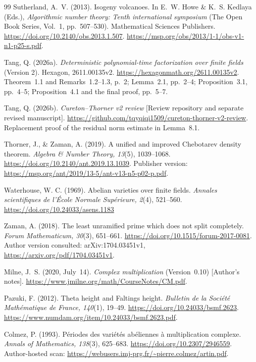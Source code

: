 \documentclass[11pt]{article}
\theoremstyle{definition}
\theoremstyle{remark}
\begin{document}
\begin{thebibliography}{99}
Sutherland, A.~V. (2013). Isogeny volcanoes.
In E.~W. Howe \& K.~S. Kedlaya (Eds.),
\emph{Algorithmic number theory: Tenth international symposium}
(The Open Book Series, Vol.~1, pp.~507--530). Mathematical Sciences Publishers.
\url{https://doi.org/10.2140/obs.2013.1.507}.
\url{https://msp.org/obs/2013/1-1/obs-v1-n1-p25-s.pdf}.

Tang, Q. (2026a).
\emph{Deterministic polynomial-time factorization over finite fields}
(Version 2). Hexagon, 2611.00135v2.
\url{https://hexagonmath.org/2611.00135v2}.
Theorem~1.1 and Remarks~1.2--1.3, p.~2; Lemma~2.1, pp.~2--4;
Proposition~3.1, pp.~4--5; Proposition~4.1 and the final proof,
pp.~5--7.

Tang, Q. (2026b).
\emph{Cureton--Thorner v2 review}
[Review repository and separate revised manuscript].
\url{https://github.com/tqyqiqi1509/cureton-thorner-v2-review}.
Replacement proof of the residual norm estimate in Lemma~8.1.

Thorner, J., \& Zaman, A. (2019).
A unified and improved Chebotarev density theorem.
\emph{Algebra \& Number Theory, 13}(5), 1039--1068.
\url{https://doi.org/10.2140/ant.2019.13.1039}.
Publisher version:
\url{https://msp.org/ant/2019/13-5/ant-v13-n5-p02-p.pdf}.

Waterhouse, W. C. (1969). Abelian varieties over finite fields.
\emph{Annales scientifiques de l'\'Ecole Normale Sup\'erieure, 2}(4),
521--560. \url{https://doi.org/10.24033/asens.1183}

Zaman, A. (2018). The least unramified prime which does not split completely.
\emph{Forum Mathematicum, 30}(3), 651--661.
\url{https://doi.org/10.1515/forum-2017-0081}.
Author version consulted: arXiv:1704.03451v1,
\url{https://arxiv.org/pdf/1704.03451v1}.

Milne, J.~S. (2020, July~14).
\emph{Complex multiplication} (Version~0.10) [Author's notes].
\url{https://www.jmilne.org/math/CourseNotes/CM.pdf}.

Pazuki, F. (2012).
Theta height and Faltings height.
\emph{Bulletin de la Soci\'et\'e Math\'ematique de France, 140}(1), 19--49.
\url{https://doi.org/10.24033/bsmf.2623}.
\url{https://www.numdam.org/item/10.24033/bsmf.2623.pdf}.

Colmez, P. (1993).
P\'eriodes des vari\'et\'es ab\'eliennes \`a multiplication complexe.
\emph{Annals of Mathematics, 138}(3), 625--683.
\url{https://doi.org/10.2307/2946559}.
Author-hosted scan: \url{https://webusers.imj-prg.fr/~pierre.colmez/artin.pdf}.


\end{thebibliography}
\end{document}
